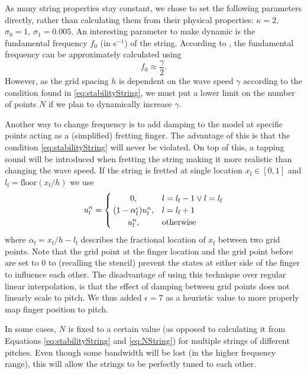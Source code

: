 As many string properties stay constant, we chose to set the following parameters directly, rather than calculating them from their physical properties: $
\kappa = 2$, $\sigma_0 = 1$, $\sigma_1 = 0.005$. An interesting parameter to make dynamic is the fundamental frequency $f_0$ (in s$^{-1}$) of the string. According to \cite{Bilbao2009:NumericalSoundSynthesis}, the fundamental frequency can be approximately calculated using
\begin{equation}
    f_0 \approx \frac{\gamma}{2}.
\end{equation}
However, as the grid spacing $h$ is dependent on the wave speed $\gamma$ according to the condition found in \eqref{eq:stabilityString}, we must put a lower limit on the number of points $N$ if we plan to dynamically increase $\gamma$.

Another way to change frequency is to add damping to the model at specific points acting as a (simplified) fretting finger. The advantage of this is that the condition \eqref{eq:stabilityString} will never be violated. On top of this, a tapping sound will be introduced when fretting the string making it more realistic than changing the wave speed. If the string is fretted at single location $x_\text{f} \in [0, 1]$ and $l_\text{f} = \text{floor}(x_\text{f}/h)$ we use
\begin{equation}
u_l^n = 
    \begin{cases}
        \hfil 0, & l = l_\text{f} - 1 \vee l = l_\text{f}\\
        \hfil (1-\alpha_\text{f}^\epsilon) u_l^n, & l = l_\text{f} + 1\\
        \hfil u_l^n, & \text{otherwise}
    \end{cases}
\end{equation}
where $\alpha_\text{f} = x_\text{f}/h - l_\text{f}$ describes the fractional location of $x_\text{f}$ between two grid points. Note that the grid point at the finger location and the grid point before are set to 0 to (recalling the stencil) prevent the states at either side of the finger to influence each other. The disadvantage of using this technique over regular linear interpolation, is that the effect of damping between grid points does not linearly scale to pitch. We thus added $\epsilon = 7$ as a heuristic value to more properly map finger position to pitch.

In some cases, $N$ is fixed to a certain value (as opposed to calculating it from Equations \eqref{eq:stabilityString} and \eqref{eq:NString}) for multiple strings of different pitches. Even though some bandwidth will be lost (in the higher frequency range), this will allow the strings to be perfectly tuned to each other.

